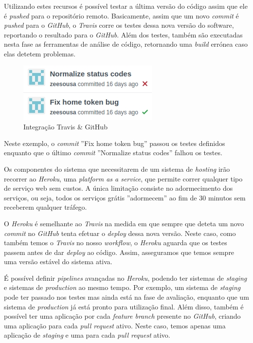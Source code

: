 Utilizando estes recursos é possível testar a última versão do código assim que ele é \textit{pushed} para o repositório remoto. Basicamente, assim que um novo \textit{commit} é \textit{pushed} para o \textit{GitHub}, o \textit{Travis} corre os testes dessa nova versão do software, reportando o resultado para o \textit{GitHub}. Além dos testes, também são executadas nesta fase as ferramentas de análise de código, retornando uma \textit{build} errónea caso elas detetem problemas.

\begin{figure}[H]
  \centering
        \includegraphics[scale=1]{img/github.jpg}
  \caption{Integração Travis \& GitHub}
\end{figure}

Neste exemplo, o \textit{commit} ''Fix home token bug'' passou os testes definidos enquanto que o último \textit{commit} ''Normalize status codes'' falhou os testes.

Os componentes do sistema que necessitarem de um sistema de \textit{hosting} irão recorrer ao \textit{Heroku}, uma \textit{platform as a service}, que permite correr qualquer tipo de serviço web sem custos. A única limitação consiste no adormecimento dos serviços, ou seja, todos os serviços grátis ''adormecem'' ao fim de 30 minutos sem receberem qualquer tráfego.

O \textit{Heroku} é semelhante ao \textit{Travis} na medida em que sempre que deteta um novo \textit{commit} no \textit{GitHub} tenta efetuar o \textit{deploy} dessa nova versão. Neste caso, como também temos o \textit{Travis} no nosso \textit{workflow}, o \textit{Heroku} aguarda que os testes passem antes de dar \textit{deploy} ao código. Assim, asseguramos que temos sempre uma versão estável do sistema ativa.

É possível definir \textit{pipelines} avançadas no \textit{Heroku}, podendo ter sistemas de \textit{staging} e sistemas de \textit{production} ao mesmo tempo. Por exemplo, um sistema de \textit{staging} pode ter passado nos testes mas ainda está na fase de avaliação, enquanto que um sistema de \textit{production} já está pronto para utilização final. Além disso, também é possível ter uma aplicação por cada \textit{feature branch} presente no \textit{GitHub}, criando uma aplicação para cada \textit{pull request} ativo. Neste caso, temos apenas uma aplicação de \textit{staging} e uma para cada \textit{pull request} ativo.


